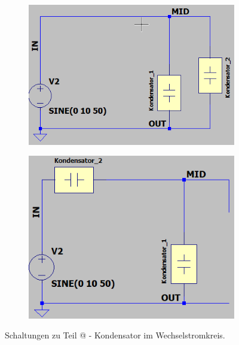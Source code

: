 \documentclass[10pt,a4paper]{article}
\makeatletter
\newcommand*{\rom}[1]{\expandafter\@slowromancap\romannumeral #1@}
\makeatother
\begin{document}
\begin{flushleft}
\begin{figure}[H]
\begin{subfigure}{0.5\linewidth}
\centering
\includegraphics[scale=0.5]{Schalt_V9_para}
\label{fig:schalt_v9_para}
\end{subfigure}%
%
\begin{subfigure}{0.5\linewidth}
\centering
\includegraphics[scale=0.5]{Schalt_V9_reihe}
\label{fig:schalt_v9_reihe}
\end{subfigure}%
\caption{Schaltungen zu Teil \rom{1} - Kondensator im Wechselstromkreis.}
\label{fig:SCHALT_KOND}
\end{figure}


\end{flushleft}
\end{document}
